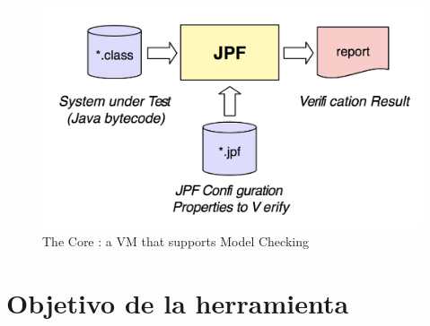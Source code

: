 \documentclass[runningheads]{llncs}
\begin{document}
\begin{figure}
\includegraphics[width=\textwidth]{fig1.png}
\caption{The Core : a VM that supports Model Checking} \label{fig1}
\end{figure}

\section{Objetivo de la herramienta}
\end{document}
